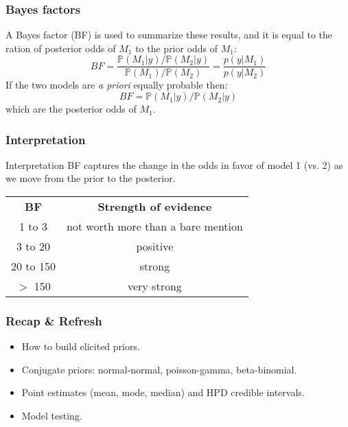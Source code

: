 \documentclass{beamer}
\renewcommand{\P}{\mathbb{P}}
\newcommand{\1}{\ensuremath{\mathbf{1}}}
\begin{document}
%
%
%
\begin{frame}\frametitle{Bayes factors}
	A Bayes factor (BF) is used to summarize these results, and it is equal to the ration of posterior odds of $M_1$ to the prior odds of $M_1$:
	\begin{equation}
		BF = \frac{\P(M_1|y)/\P(M_2|y)}{\P(M_1)/\P(M_2)} = \frac{p(y|M_1)}{p(y|M_2)}
	\end{equation}
	If the two models are \emph{a priori} equally probable then:
	\begin{equation}
		BF = \P(M_1|y)/\P(M_2|y)
	\end{equation}
	which are the posterior odds of $M_1$.
\end{frame}
%
%
%
\begin{frame}\frametitle{Interpretation}
	\begin{block}{Interpretation}
		BF captures the change in the odds in favor of model 1 (vs. 2) as we move from the prior to the posterior.
	\end{block}
	\begin{center}
	\begin{tabular}{c|c}
		\textbf{BF}		& \textbf{Strength of evidence}\\
		1 to 3			& not worth more than a bare mention\\
		3 to 20			& positive\\
		20 to 150		& strong\\
		$>$ 150			& very strong\\
	\end{tabular}
	\end{center}
\end{frame}
%
%
%
\begin{frame}\frametitle{Recap \& Refresh}
	\begin{itemize}
		\item How to build elicited priors.
		\item Conjugate priors: normal-normal, poisson-gamma, beta-binomial.
		\item Point estimates (mean, mode, median) and HPD credible intervals.
		\item Model testing.
	\end{itemize}
\end{frame}
\end{document}
